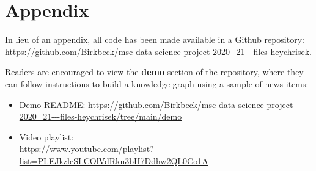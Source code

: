 \documentclass[11pt]{article}
\begin{document}
\newpage

\section{Appendix}

In lieu of an appendix, all code has been made available in a Github repository: \url{https://github.com/Birkbeck/msc-data-science-project-2020_21---files-heychrisek}.

Readers are encouraged to view the \textbf{demo} section of the repository, where they can follow instructions to build a knowledge graph using a sample of news items:
\begin{itemize}
  \item{Demo README: \url{https://github.com/Birkbeck/msc-data-science-project-2020_21---files-heychrisek/tree/main/demo}}
  \item{Video playlist:\\\url{https://www.youtube.com/playlist?list=PLEJkzlcSLCOlVdRku3bH7Ddhw2QL0Co1A}}
\end{itemize}

\newpage



\end{document}
